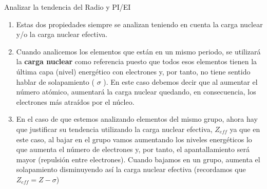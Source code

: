 \begin{consejos}{Analizar la tendencia del Radio y PI/EI}
    \begin{enumerate}
        \item Estas dos propiedades siempre se analizan teniendo en cuenta la carga nuclear y/o la carga nuclear efectiva.
        \item Cuando analicemos los elementos que están en un mismo periodo, se utilizará la \textbf{carga nuclear} como referencia puesto que todos esos elementos tienen la última capa (nivel) energético con electrones y, por tanto, no tiene sentido hablar de solapamiento ( \(\sigma\) ). En este caso debemos decir que al aumentar el número atómico, aumentará la carga nuclear quedando, en consecuencia, los electrones más atraídos por el núcleo.
        \item En el caso de que estemos analizando elementos del mismo grupo, ahora hay que justificar su tendencia utilizando la carga nuclear efectiva, \(Z_{eff}\) ya que en este caso, al bajar en el grupo vamos aumentando los niveles energéticos lo que aumenta el número de electrones y, por tanto, el apantallamiento será mayor (repulsión entre electrones).
        Cuando bajamos en un grupo, aumenta el solapamiento disminuyendo así la carga nuclear efectiva (recordamos que \(Z_{eff} = Z - \sigma\))
    \end{enumerate}
\end{consejos}


